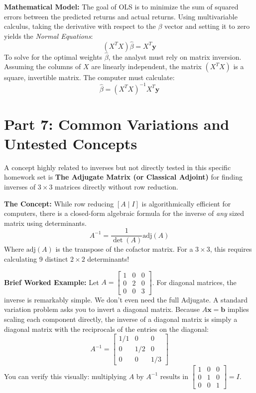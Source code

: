 \documentclass[11pt]{article}
\begin{document}
\textbf{Mathematical Model:}
The goal of OLS is to minimize the sum of squared errors between the predicted returns and actual returns. Using multivariable calculus, taking the derivative with respect to the $\beta$ vector and setting it to zero yields the \textit{Normal Equations}:
\[ (X^T X) \hat{\beta} = X^T \mathbf{y} \]
To solve for the optimal weights $\hat{\beta}$, the analyst must rely on matrix inversion. Assuming the columns of $X$ are linearly independent, the matrix $(X^T X)$ is a square, invertible matrix. The computer must calculate:
\[ \hat{\beta} = (X^T X)^{-1} X^T \mathbf{y} \]

\newpage
\section{Part 7: Common Variations and Untested Concepts}

A concept highly related to inverses but not directly tested in this specific homework set is \textbf{The Adjugate Matrix (or Classical Adjoint)} for finding inverses of $3 \times 3$ matrices directly without row reduction.

\textbf{The Concept:}
While row reducing $[A \mid I]$ is algorithmically efficient for computers, there is a closed-form algebraic formula for the inverse of \textit{any} sized matrix using determinants. 
\[ A^{-1} = \frac{1}{\det(A)} \text{adj}(A) \]
Where $\text{adj}(A)$ is the transpose of the cofactor matrix. For a $3 \times 3$, this requires calculating 9 distinct $2 \times 2$ determinants!

\textbf{Brief Worked Example:}
Let $A = \begin{bmatrix} 1 & 0 & 0 \\ 0 & 2 & 0 \\ 0 & 0 & 3 \end{bmatrix}$. 
For diagonal matrices, the inverse is remarkably simple. We don't even need the full Adjugate. A standard variation problem asks you to invert a diagonal matrix.
Because $A \mathbf{x} = \mathbf{b}$ implies scaling each component directly, the inverse of a diagonal matrix is simply a diagonal matrix with the reciprocals of the entries on the diagonal:
\[ A^{-1} = \begin{bmatrix} 1/1 & 0 & 0 \\ 0 & 1/2 & 0 \\ 0 & 0 & 1/3 \end{bmatrix} \]
You can verify this visually: multiplying $A$ by $A^{-1}$ results in $\begin{bmatrix} 1 & 0 & 0 \\ 0 & 1 & 0 \\ 0 & 0 & 1 \end{bmatrix} = I$.
\end{document}
